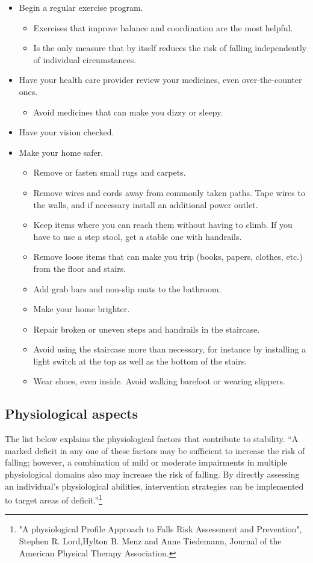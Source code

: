\begin{itemize}
\item Begin a regular exercise program.
\begin{itemize}
\item Exercises that improve balance and coordination are the most helpful.
\item Is the only measure that by itself reduces the risk of falling independently of individual circumstances. 
\end{itemize}
\item Have your health care provider review your medicines, even over-the-counter ones.
\begin{itemize}
\item Avoid medicines that can make you dizzy or sleepy.
\end{itemize}
\item Have your vision checked.
\item Make your home safer.
\begin{itemize}
\item Remove or fasten small rugs and carpets.
\item Remove wires and cords away from commonly taken paths. Tape wires to the walls, and if necessary install an additional power outlet.
\item Keep items where you can reach them without having to climb. If you have to use a step stool, get a stable one with handrails.
\item Remove loose items that can make you trip (books, papers, clothes, etc.) from the floor and stairs.
\item Add grab bars and non-slip mats to the bathroom.
\item Make your home brighter.
\item Repair broken or uneven steps and handrails in the staircase.
\item Avoid using the staircase more than necessary, for instance by installing a light switch at the top as well as the bottom of the stairs. 
\item Wear shoes, even inside. Avoid walking barefoot or wearing slippers.
\end{itemize}
\end{itemize}

\subsection{Physiological aspects}

The list below explains the physiological factors that contribute to stability. “A marked deficit in any one of these factors may be sufficient to increase the risk of falling; however, a combination of mild or moderate impairments in multiple physiological domains also may increase the risk of falling. By directly assessing an individual's physiological abilities, intervention strategies can be implemented to target areas of deficit.”\footnote{"A physiological Profile Approach to Falls Risk Assessment and Prevention", Stephen R. Lord,Hylton B. Menz and Anne Tiedemann, Journal of the American Physical Therapy Association. } \cite{LMTassessPrev}

